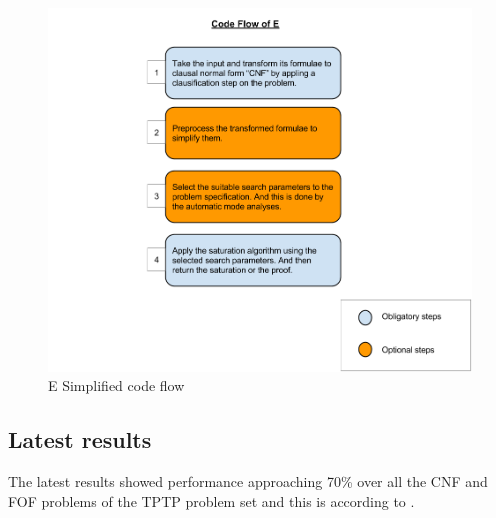 	\begin{figure}[H]
		\centering
		\includegraphics[scale=0.45]{pictures/e_code_flow.png}
		\caption{E Simplified code flow}\label{fig:e_code_flow}
	\end{figure}



\subsection{Latest results}
The latest results showed performance approaching 70\% over all the CNF and FOF problems of the TPTP problem set and this is according to \cite{E13}.